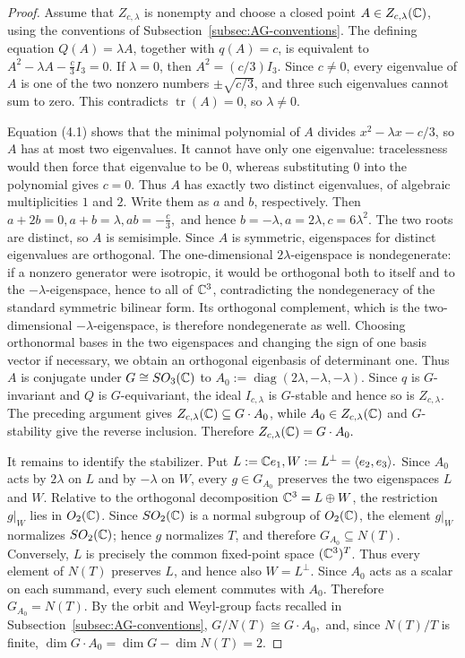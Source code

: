 \documentclass[10pt,a4paper]{amsart}
\numberwithin{equation}{section} \newtheorem{thm}{Theorem}[section] \newtheorem{lem}[thm]{Lemma} \newtheorem{ex}[thm]{Example} \newtheorem{prop}[thm]{Proposition} \newtheorem{cor}[thm]{Corollary} \newtheorem{defi}[thm]{Definition} \newtheorem{rmk}[thm]{Remark} \newtheorem{notation}[thm]{Notation}
\begin{document}
\begin{proof}
Assume that $Z_{c,\lambda}$ is nonempty and choose a closed point $A\in Z_{c,\lambda}(\mathbb{C})$, using the conventions of Subsection~\ref{subsec:AG-conventions}. The defining equation $Q(A)=\lambda A$, together with $q(A)=c$, is equivalent to \(A^2-\lambda A-\frac c3I_3=0\). If $\lambda=0$, then $A^2=(c/3)I_3$. Since $c\ne0$, every eigenvalue of $A$ is one of the two nonzero numbers $\pm\sqrt{c/3}$, and three such eigenvalues cannot sum to zero. This contradicts $\operatorname{tr}(A)=0$, so $\lambda\ne0$.

Equation (4.1) shows that the minimal polynomial of $A$ divides $x^2-\lambda x-c/3$, so $A$ has at most two eigenvalues. It cannot have only one eigenvalue: tracelessness would then force that eigenvalue to be $0$, whereas substituting $0$ into the polynomial gives $c=0$. Thus $A$ has exactly two distinct eigenvalues, of algebraic multiplicities $1$ and $2$. Write them as $a$ and $b$, respectively. Then \(a+2b=0,a+b=\lambda,ab=-\frac c3,\) and hence \(b=-\lambda,a=2\lambda,c=6\lambda^2.\) The two roots are distinct, so $A$ is semisimple. Since $A$ is symmetric, eigenspaces for distinct eigenvalues are orthogonal. The one-dimensional $2\lambda$-eigenspace is nondegenerate: if a nonzero generator were isotropic, it would be orthogonal both to itself and to the $-\lambda$-eigenspace, hence to all of $\mathbb{C}^3$, contradicting the nondegeneracy of the standard symmetric bilinear form. Its orthogonal complement, which is the two-dimensional $-\lambda$-eigenspace, is therefore nondegenerate as well. Choosing orthonormal bases in the two eigenspaces and changing the sign of one basis vector if necessary, we obtain an orthogonal eigenbasis of determinant one. Thus $A$ is conjugate under $G\cong SO_3(\mathbb{C})$ to \(A_0:=\operatorname{diag}(2\lambda,-\lambda,-\lambda).\) Since $q$ is $G$-invariant and $Q$ is $G$-equivariant, the ideal $I_{c,\lambda}$ is $G$-stable and hence so is $Z_{c,\lambda}$. The preceding argument gives $Z_{c,\lambda}(\mathbb{C})\subseteq G\cdot A_0$, while $A_0\in Z_{c,\lambda}(\mathbb{C})$ and $G$-stability give the reverse inclusion. Therefore \(Z_{c,\lambda}(\mathbb{C})=G\cdot A_0.\)

It remains to identify the stabilizer. Put \(L:=\mathbb{C} e_1,W:=L^\perp=\langle e_2,e_3\rangle.\) Since $A_0$ acts by $2\lambda$ on $L$ and by $-\lambda$ on $W$, every $g\in G_{A_0}$ preserves the two eigenspaces $L$ and $W$. Relative to the orthogonal decomposition $\mathbb{C}^3=L\oplus W$, the restriction $g|_W$ lies in $O_2(\mathbb{C})$. Since $SO_2(\mathbb{C})$ is a normal subgroup of $O_2(\mathbb{C})$, the element $g|_W$ normalizes $SO_2(\mathbb{C})$; hence $g$ normalizes $T$, and therefore $G_{A_0}\subseteq N(T)$. Conversely, $L$ is precisely the common fixed-point space $(\mathbb{C}^3)^T$. Thus every element of $N(T)$ preserves $L$, and hence also $W=L^\perp$. Since $A_0$ acts as a scalar on each summand, every such element commutes with $A_0$. Therefore \(G_{A_0}=N(T).\) By the orbit and Weyl-group facts recalled in Subsection~\ref{subsec:AG-conventions}, \(G/N(T)\cong G\cdot A_0,\) and, since $N(T)/T$ is finite, \(\dim G\cdot A_0=\dim G-\dim N(T)=2.\)


\end{proof}
\end{document}
